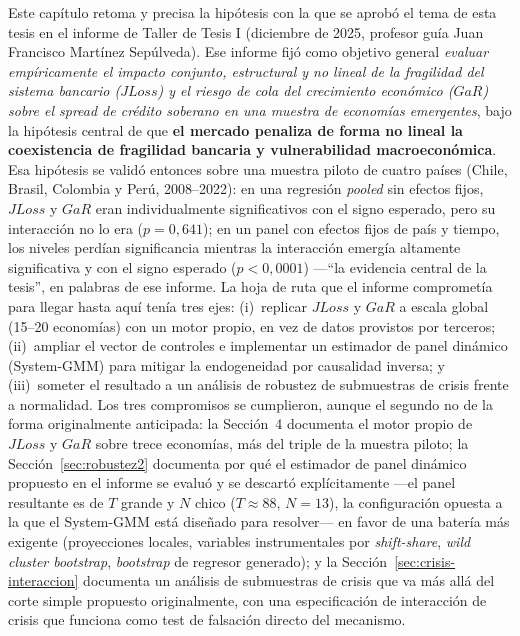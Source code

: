Este capítulo retoma y precisa la hipótesis con la que se aprobó el tema de esta tesis en el informe de Taller de Tesis I (diciembre de 2025, profesor guía Juan Francisco Martínez Sepúlveda). Ese informe fijó como objetivo general \textit{evaluar empíricamente el impacto conjunto, estructural y no lineal de la fragilidad del sistema bancario ($JLoss$) y el riesgo de cola del crecimiento económico ($GaR$) sobre el spread de crédito soberano en una muestra de economías emergentes}, bajo la hipótesis central de que \textbf{el mercado penaliza de forma no lineal la coexistencia de fragilidad bancaria y vulnerabilidad macroeconómica}. Esa hipótesis se validó entonces sobre una muestra piloto de cuatro países (Chile, Brasil, Colombia y Perú, 2008--2022): en una regresión \textit{pooled} sin efectos fijos, $JLoss$ y $GaR$ eran individualmente significativos con el signo esperado, pero su interacción no lo era ($p=0{,}641$); en un panel con efectos fijos de país y tiempo, los niveles perdían significancia mientras la interacción emergía altamente significativa y con el signo esperado ($p<0{,}0001$) —``la evidencia central de la tesis'', en palabras de ese informe. La hoja de ruta que el informe comprometía para llegar hasta aquí tenía tres ejes: (i)~replicar $JLoss$ y $GaR$ a escala global (15--20 economías) con un motor propio, en vez de datos provistos por terceros; (ii)~ampliar el vector de controles e implementar un estimador de panel dinámico (System-GMM) para mitigar la endogeneidad por causalidad inversa; y (iii)~someter el resultado a un análisis de robustez de submuestras de crisis frente a normalidad. Los tres compromisos se cumplieron, aunque el segundo no de la forma originalmente anticipada: la Sección~4 documenta el motor propio de $JLoss$ y $GaR$ sobre trece economías, más del triple de la muestra piloto; la Sección~\ref{sec:robustez2} documenta por qué el estimador de panel dinámico propuesto en el informe se evaluó y se descartó explícitamente —el panel resultante es de $T$ grande y $N$ chico ($T\approx88$, $N=13$), la configuración opuesta a la que el System-GMM está diseñado para resolver— en favor de una batería más exigente (proyecciones locales, variables instrumentales por \textit{shift-share}, \textit{wild cluster bootstrap}, \textit{bootstrap} de regresor generado); y la Sección~\ref{sec:crisis-interaccion} documenta un análisis de submuestras de crisis que va más allá del corte simple propuesto originalmente, con una especificación de interacción de crisis que funciona como test de falsación directo del mecanismo.

